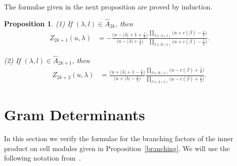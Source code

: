 \documentclass[11pt,a4paper,reqno,svgnames]{amsart}
\theoremstyle{plain}
\newtheorem{proposition}[theorem]{Proposition}
\theoremstyle{definition}
\numberwithin{equation}{section}
\begin{document}
The formulae given in the next proposition are proved by induction. 
\begin{proposition}\label{c-f-r}
(1) If $(\lambda,l)\in\hat{A}_{2k}$, then 
\begin{align}
Z_{2k+1}(u,\lambda)&=-
{\displaystyle\frac{\big(u-|\lambda|+1+\frac{z}{2}\big)}{\big(u-|\lambda|+\frac{z}{2}\big)}
\frac{\prod_{\beta\in A(\lambda)}\big(u+c(\beta)-\frac{z}{2}\big)}{\prod_{\beta\in R(\lambda)}\big(u+c(\beta)-\frac{z}{2}\big)}}.\label{c-f-r-2}
\end{align}
\item[(2)]If $(\lambda,l)\in\hat{A}_{2k+1}$, then
\begin{align}
Z_{2k+2}(u,\lambda)&=
{\displaystyle
\frac{\big(u+|\lambda|+1-\frac{z}{2}\big)}{\big(u+|\lambda|-\frac{z}{2}\big)}
\frac{\prod_{\beta\in R(\lambda)}\big(u-c(\beta)+\frac{z}{2}\big)}{\prod_{\beta\in A(\lambda)}\big(u-c(\beta)+\frac{z}{2}\big)}.}\label{c-f-r-1}
\end{align}
\end{proposition}
\section{Gram Determinants}\label{det-proof}
In this section we verify the formulae for the branching factors of the inner product on cell modules given in Proposition~\ref{branching}. We will use the following notation from~\cite[Theorem~4.2]{EG:2012}.
\end{document}
